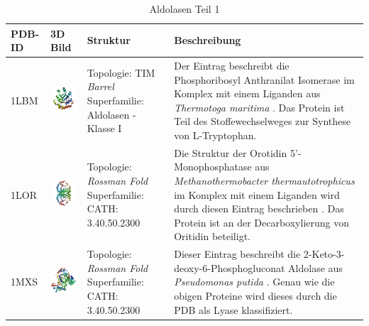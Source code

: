 \documentclass{report}
\begin{document}
\begin{table}
\begin{center}
\caption{Aldolasen Teil 1}
\begin{tabular}{ | C{9mm} | C{30mm} | C{29mm} | C{38mm} | }
\hline
PDB-ID & 3D Bild & Struktur & Beschreibung \\ \hline
1LBM  & \includegraphics[width=30mm, trim= -10 -5 -5 -10]{1LBM_bio_r_500.jpg} & Topologie: \newline TIM \textit{Barrel} \newline Superfamilie: Aldolasen - Klasse I & Der Eintrag beschreibt die Phosphoribosyl Anthranilat Isomerase im Komplex mit einem Liganden aus \textit{Thermotoga maritima} \cite{1lbm}. Das Protein ist Teil des Stoffewechselweges zur Synthese von L-Tryptophan. \\ \hline
1LOR  & \includegraphics[width=30mm, trim= -10 -5 -5 -10]{1LOR_bio_r_500.jpg} & Topologie: \newline \textit{\textit{Rossman Fold}} \newline Superfamilie: CATH: 3.40.50.2300  & Die Struktur der Orotidin 5'-Monophosphatase aus \textit{Methanothermobacter thermautotrophicus} im Komplex mit einem Liganden wird durch diesen Eintrag beschrieben \cite{1lor}. Das Protein ist an der Decarboxylierung von Oritidin beteiligt. \\ \hline
1MXS  & \includegraphics[width=30mm, trim= -10 -5 -5 -10]{1MXS_bio_r_500.jpg} & Topologie: \newline \textit{\textit{Rossman Fold}} \newline Superfamilie: CATH: 3.40.50.2300  & Dieser Eintrag beschreibt die 2-Keto-3-deoxy-6-Phosphogluconat Aldolase aus \textit{Pseudomonas putida} \cite{1mxs}. Genau wie die obigen Proteine wird dieses durch die PDB als Lyase klassifiziert. \\ \hline

\end{tabular}
\end{center}
\end{table}
\end{document}
